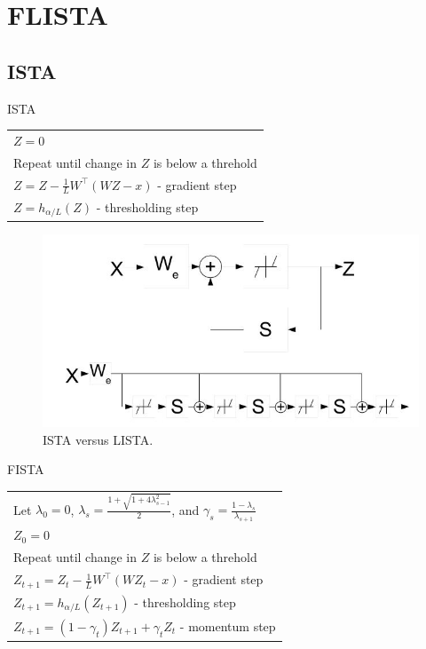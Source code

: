 \documentclass{article} %
\begin{document}
\newpage

\section{FLISTA}

\subsection{ISTA}

\begin{algorithm}
\caption{ISTA}
\begin{tabular}{l}
$Z = 0$\\
Repeat until change in $Z$ is below a threhold\\
\:\:\:\:\:$Z = Z - \frac{1}{L}W^{\top}(WZ-x)$ \:\:\:\:\:\:\:\:\:\:\:\:\:\:- gradient step\\
\:\:\:\:\:$Z = h_{\alpha/L}(Z)$ \:\:\:\:\:\:\:\:\:\:\:\:\:\:\:\:\:\:\:\:\:\:\:\:\:\:\:\:\:\:\:\:\:\:\:\:\:\:- thresholding step
\end{tabular}
\label{alg:ISTA}
\end{algorithm}

\begin{figure}[h]
  \center
\includegraphics[width = 5in]{ISTAvsLISTA.jpg}
\caption{ISTA versus LISTA.}
\label{fig:ISTAvsLISTA}
\end{figure} 

\begin{algorithm}
\caption{FISTA}
\begin{tabular}{l}
Let $\lambda_0 = 0$, $\lambda_s = \frac{1 + \sqrt{1+4\lambda_{s-1}^2}}{2}$, and $\gamma_s = \frac{1-\lambda_s}{\lambda_{s+1}}$\\
$Z_0 = 0$\\
Repeat until change in $Z$ is below a threhold\\
\:\:\:\:\:$Z_{t+1} = Z_t - \frac{1}{L}W^{\top}(WZ_t-x)$ \:\:\:\:\:\:\:\:\:\:\:\:\:\:- gradient step\\
\:\:\:\:\:$Z_{t+1} = h_{\alpha/L}(Z_{t+1})$ \:\:\:\:\:\:\:\:\:\:\:\:\:\:\:\:\:\:\:\:\:\:\:\:\:\:\:\:\:\:\:\:\:\:\:- thresholding step\\
\:\:\:\:\:$Z_{t+1} = (1-\gamma_t)Z_{t+1} + \gamma_tZ_t$ \:\:\:\:\:\:\:\:\:\:\:\:\:\:\:\:\:\:\:- momentum step
\end{tabular}
\label{alg:FISTA}
\end{algorithm}




\small{


}
\end{document}
